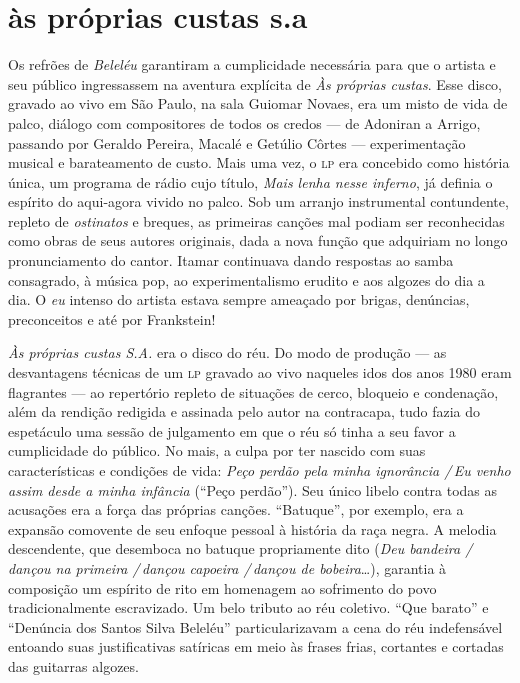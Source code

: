 \section{às próprias custas s.a}

Os refrões de \textit{Beleléu} garantiram a cumplicidade necessária para que o
artista e seu público ingressassem na aventura explícita de \textit{Às próprias
custas}. Esse disco, gravado ao vivo em São Paulo, na sala Guiomar
Novaes, era um misto de vida de palco, diálogo com compositores de todos
os credos --- de Adoniran a Arrigo, passando por Geraldo Pereira, Macalé e
Getúlio Côrtes --- experimentação musical e barateamento de custo. Mais
uma vez, o \textsc{lp} era concebido como história única, um programa de rádio
cujo título, \textit{Mais lenha nesse inferno}, já definia o espírito do
aqui-agora vivido no palco. Sob um arranjo instrumental contundente,
repleto de \textit{ostinatos} e breques, as primeiras canções mal podiam ser
reconhecidas como obras de seus autores originais, dada a nova função
que adquiriam no longo pronunciamento do cantor. Itamar continuava
dando respostas ao samba consagrado, à música pop, ao experimentalismo
erudito e aos algozes do dia a dia. O \textit{eu} intenso do artista estava
sempre ameaçado por brigas, denúncias, preconceitos e até por
Frankstein!

\textit{Às próprias custas \textsc{S.A.}} era o disco do réu. Do modo de produção --- as
desvantagens técnicas de um \textsc{lp} gravado ao vivo naqueles idos dos anos
1980 eram flagrantes --- ao repertório repleto de situações de cerco,
bloqueio e condenação, além da rendição redigida e assinada pelo autor
na contracapa, tudo fazia do espetáculo uma sessão de julgamento em que
o réu só tinha a seu favor a cumplicidade do público. No mais, a culpa
por ter nascido com suas características e condições de vida: \textit{Peço
perdão pela minha ignorância /\,Eu venho assim desde a minha infância}
(``Peço perdão''). Seu único libelo contra todas as acusações era a força
das próprias canções. ``Batuque'', por exemplo, era a expansão comovente de
seu enfoque pessoal à história da raça negra. A melodia descendente, que
desemboca no batuque propriamente dito (\textit{Deu bandeira /\,dançou na
primeira /\,dançou capoeira /\,dançou de bobeira}\ldots), garantia à
composição um espírito de rito em homenagem ao sofrimento do povo
tradicionalmente escravizado. Um belo tributo ao réu coletivo. ``Que
barato'' e ``Denúncia dos Santos Silva Beleléu'' particularizavam a cena do
réu indefensável entoando suas justificativas satíricas em meio às
frases frias, cortantes e cortadas das guitarras algozes.

